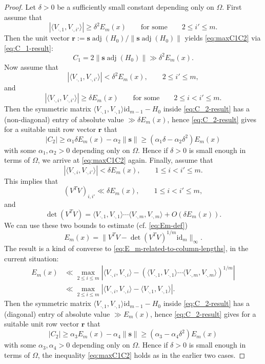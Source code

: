 \documentclass[11pt,oneside]{amsart}
\numberwithin{equation}{section}
\theoremstyle{remark}
\theoremstyle{plain}
\DeclareMathOperator{\adj}{adj}
\newcommand\id{\mathrm{id}}
\newcommand{\br}{\mathbf{r}}
\newcommand{\mbs}{\mathbf{s}}
\renewcommand\leq{\leqslant}
\renewcommand\geq{\geqslant}
\begin{document}
\begin{proof}
Let $\delta>0$ be a sufficiently small constant depending only on $\Omega$.
First assume that
\[
|\langle V_{\cdot,1}, V_{\cdot,i'} \rangle|\geq \delta^2 E_{m}(x) \qquad \text{for some} \qquad 2\leq i'\leq m.
\]
Then the unit vector $\br:=\mbs\adj(H_0)/\|\mbs\adj(H_0)\|$ yields \eqref{eq:maxC1C2} via \eqref{eq:C_1-result}:
\[
C_1=2\|\mbs\adj(H_0)\|\gg \delta^2 E_{m}(x).
\]
Now assume that
\[
|\langle V_{\cdot,1}, V_{\cdot,i'} \rangle| < \delta^2 E_{m}(x), \qquad 2\leq i'\leq m,
\]
and
\[
|\langle V_{\cdot,i}, V_{\cdot,i'} \rangle|\geq \delta E_{m}(x) \qquad \text{for some} \qquad 2\leq i<i'\leq m.
\]
Then the symmetric matrix $\langle V_{\cdot,1},V_{\cdot,1} \rangle \id_{m-1} - H_0$ inside \eqref{eq:C_2-result} has a (non-diagonal) entry of absolute value $\gg \delta E_{m}(x)$, hence \eqref{eq:C_2-result} gives for a suitable unit row vector $\br$ that 
\[
|C_2|\geq \alpha_1 \delta E_{m}(x) - \alpha_2 \|\mbs\| \geq (\alpha_1 \delta - \alpha_2 \delta^2) E_{m}(x)
\]
with some $\alpha_1,\alpha_2>0$ depending only on $\Omega$. 
Hence if $\delta>0$ is small enough in terms of $\Omega$, we arrive at \eqref{eq:maxC1C2} again. Finally, assume that
\[
|\langle V_{\cdot,i},V_{\cdot,i'} \rangle|<\delta E_{m}(x), \qquad 1\leq i<i'\leq m.
\]
This implies that
\[
(V^T V)_{i,i'} \ll \delta E_{m}(x), \qquad 1\leq i<i'\leq m,
\]
and
\[
\det(V^T V)=\langle V_{\cdot,1},V_{\cdot,1} \rangle \dotsb \langle V_{\cdot,m},V_{\cdot,m} \rangle + O(\delta E_{m}(x)).
\]
We can use these two bounds to estimate (cf. \eqref{eq:Em-def})
\[
E_{m}(x)=\|V^TV - \det(V^T V)^{1/m}\id_m\|_{\infty}.
\]
The result is a kind of converse to \eqref{eq:E_m-related-to-column-lengths}, in the current situation:
\begin{align*}
E_{m}(x) & \ll \max_{2\leq i\leq m} \left| \langle V_{\cdot,i}, V_{\cdot,i} \rangle - (\langle V_{\cdot,1},V_{\cdot,1} \rangle \dotsb \langle V_{\cdot,m},V_{\cdot,m} \rangle)^{1/m} \right|
\\ & \ll \max_{2\leq i\leq m} \left| \langle V_{\cdot,i}, V_{\cdot,i} \rangle - \langle V_{\cdot,1}, V_{\cdot,1} \rangle \right|.
\end{align*}
Then the symmetric matrix $\langle V_{\cdot,1},V_{\cdot,1} \rangle \id_{m-1} - H_0$ inside \eqref{eq:C_2-result} has a (diagonal) entry of absolute value $\gg E_{m}(x)$, hence \eqref{eq:C_2-result} gives for a suitable unit row vector $\br$ that 
\[
|C_2|\geq \alpha_3 E_{m}(x) - \alpha_4 \|\mbs\| \geq (\alpha_3 - \alpha_4 \delta^2) E_{m}(x)
\]
with some $\alpha_3,\alpha_4>0$ depending only on $\Omega$. 
Hence if $\delta>0$ is small enough in terms of $\Omega$, the inequality \eqref{eq:maxC1C2} holds as in the earlier two cases.
\end{proof}
\end{document}
